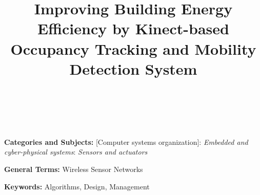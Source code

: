 \documentclass[preprint]{sig-alternate-10pt}
\begin{document}
\title{Improving Building Energy Efficiency by Kinect-based Occupancy
  Tracking and Mobility Detection System}

\author{\alignauthor  \ \\
 \\
}


\makeatletter
\let\@copyrightspace\relax
\makeatother

\pagestyle{plain}
\thispagestyle{plain}

\maketitle


\begin{abstract}

\end{abstract}


\noindent
{\bf Categories and Subjects:} {[Computer systems organization]}: {\em Embedded and cyber-physical systems}: {\em Sensors and actuators}

\noindent
{\bf General Terms: }Wireless Sensor Networks


\noindent
{\bf Keywords: }Algorithms, Design, Management
\\














\end{document}
